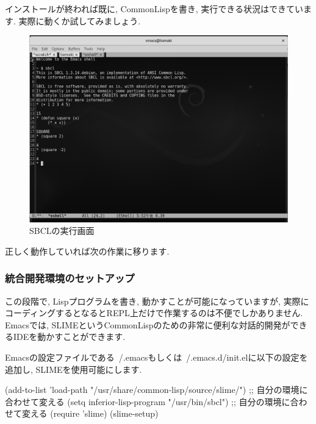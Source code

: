 \documentclass[mingoth,a4paper]{jsarticle}
\begin{document}
	
インストールが終われば既に, CommonLispを書き, 実行できる状況はできています. 実際に動くか試してみましょう. 

\begin{figure}[htbp!]
\centering
\includegraphics[width=\linewidth]{image201709-kansai/sbcl_gray.png}
\caption{SBCLの実行画面}
\end{figure}

正しく動作していれば次の作業に移ります. 

\subsubsection{統合開発環境のセットアップ}
この段階で, Lispプログラムを書き, 動かすことが可能になっていますが, 実際にコーディングするとなるとREPL上だけで作業するのは不便でしかありません. 
Emacsでは, SLIMEというCommonLispのための非常に便利な対話的開発ができるIDEを動かすことができます. 


Emacsの設定ファイルである~/.emacsもしくは~/.emacs.d/init.elに以下の設定を追加し, SLIMEを使用可能にします. 


\begin{commandline}
(add-to-list 'load-path "/usr/share/common-lisp/source/slime/") ;; 自分の環境に合わせて変える
(setq inferior-lisp-program "/usr/bin/sbcl") ;; 自分の環境に合わせて変える
(require 'slime)
(slime-setup)
\end{commandline}
\end{document}
